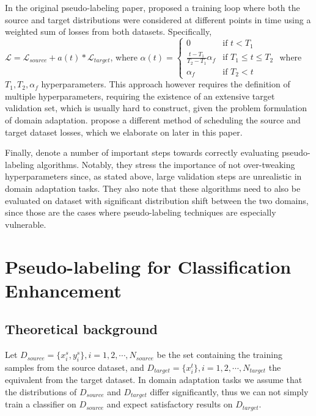 \documentclass{article}
\newcommand{\loss}{\mathcal{L}}
\begin{document}
	In the original pseudo-labeling paper, \cite{pseudo-label-original} proposed a training loop where both the source and target distributions were considered at different points in time using a weighted sum of losses from both datasets. Specifically, $\loss = \loss_{source} + a(t) * \loss_{target}$, where $\alpha(t) = 
	\begin{cases} 0 & \text{if } t < T_1 \\
		\frac{t-T_1}{T_2-T_1}\alpha_f & \text{if } T_1 \leq t \leq T_2 \\
		\alpha_f & \text{if } T_2 < t
	\end{cases}$
	where $T_1, T_2, \alpha_f$ hyperparameters. This approach however requires the definition of multiple hyperparameters, requiring the existence of an extensive target validation set, which is usually hard to construct, given the problem formulation of domain adaptation. \cite{ican} propose a different method of scheduling the source and target dataset losses, which we elaborate on later in this paper.
	
	Finally, \cite{pseudo-label-evaluation} denote a number of important steps towards correctly evaluating pseudo-labeling algorithms. Notably, they stress the importance of not over-tweaking hyperparameters since, as stated above, large validation steps are unrealistic in domain adaptation tasks. They also note that these algorithms need to also be evaluated on dataset with significant distribution shift between the two domains, since those are the cases where pseudo-labeling techniques are especially vulnerable.
	
	
	\section{Pseudo-labeling for Classification Enhancement}
	
	\subsection{Theoretical background}
	
	
	Let $D_{source} = \{x_i^s, y_i^s\}, i=1,2,\cdots, N_{source}$ be the set containing the training samples from the source dataset, and $D_{target} = \{x_i^t\}, i=1,2,\cdots, N_{target}$ the equivalent from the target dataset. In domain adaptation tasks we assume that the distributions of $D_{source}$ and $D_{target}$ differ significantly, thus we can not simply train a classifier on $D_{source}$ and expect satisfactory results on $D_{target}$.
	
\end{document}
